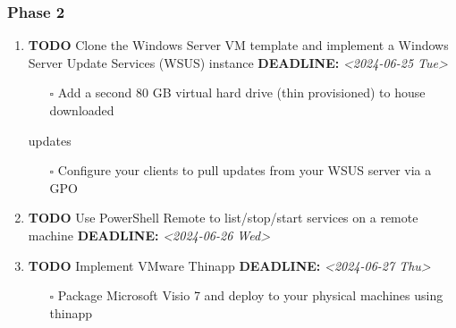 \documentclass[letterpaper]{article}
\begin{document}
\subsubsection{Phase 2}
\label{sec:orgfc8dcfc}
\begin{enumerate}
\item {\bfseries\sffamily TODO} Clone the Windows Server VM template and implement a Windows Server Update Services (WSUS) instance
\label{sec:org2a62023}
\noindent\textbf{DEADLINE:} \textit{<2024-06-25 Tue>}\\[0pt]
\begin{itemize}
\item[{$\square$}] Add a second 80 GB virtual hard drive (thin provisioned) to house downloaded
\end{itemize}
updates
\begin{itemize}
\item[{$\square$}] Configure your clients to pull updates from your WSUS server via a GPO
\end{itemize}
\item {\bfseries\sffamily TODO} Use PowerShell Remote to list/stop/start services on a remote machine
\label{sec:org5ac312f}
\noindent\textbf{DEADLINE:} \textit{<2024-06-26 Wed>}\\[0pt]
\item {\bfseries\sffamily TODO} Implement VMware Thinapp
\label{sec:orgfae497e}
\noindent\textbf{DEADLINE:} \textit{<2024-06-27 Thu>}\\[0pt]
\begin{itemize}
\item[{$\square$}] Package Microsoft Visio 7 and deploy to your physical machines using thinapp
\end{itemize}
\end{enumerate}
\end{document}
